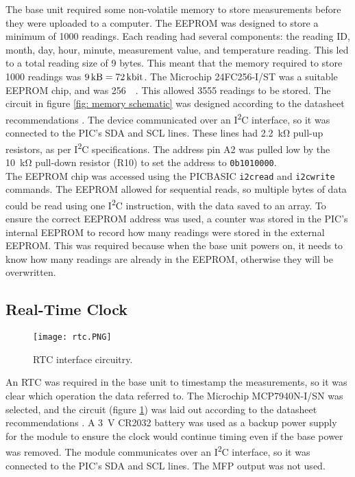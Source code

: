 The base unit required some non-volatile memory to store measurements before they were uploaded to a computer. The EEPROM was designed to store a minimum of 1000 readings. Each reading had several components: the reading ID, month, day, hour, minute, measurement value, and temperature reading. This led to a total reading size of 9 bytes. This meant that the memory required to store 1000 readings was $\SI{9}{\kilo\byte}=\SI{72}{\kilo\bit}$. The Microchip 24FC256-I/ST \cite{memory} was a suitable EEPROM chip, and was \SI{256}{\kilo\bit}. This allowed 3555 readings to be stored. The circuit in figure \ref{fig: memory schematic} was designed according to the datasheet recommendations \cite{memory}. The device communicated over an I\textsuperscript{2}C interface, so it was connected to the PIC's SDA and SCL lines. These lines had \SI{2.2}{\kilo\ohm} pull-up resistors, as per I\textsuperscript{2}C specifications. The address pin A2 was pulled low by the \SI{10}{\kilo\ohm} pull-down resistor (R10) to set the address to \verb|0b1010000|.\\

The EEPROM chip was accessed using the PICBASIC \verb|i2cread| and \verb|i2cwrite| commands. The EEPROM allowed for sequential reads, so multiple bytes of data could be read using one I\textsuperscript{2}C instruction, with the data saved to an array. To ensure the correct EEPROM address was used, a counter was stored in the PIC's internal EEPROM to record how many readings were stored in the external EEPROM. This was required because when the base unit powers on, it needs to know how many readings are already in the EEPROM, otherwise they will be overwritten.





\subsection{Real-Time Clock}
\begin{figure}[htb]
	\centering
	\texttt{[image: rtc.PNG]}
	\caption{RTC interface circuitry.}
	\label{fig: rtc schematic}
\end{figure}

An RTC was required in the base unit to timestamp the measurements, so it was clear which operation the data referred to. The Microchip MCP7940N-I/SN \cite{rtc} was selected, and the circuit (figure \ref{fig: rtc schematic}) was laid out according to the datasheet recommendations \cite{rtc}. A \SI{3}{\volt} CR2032 battery was used as a backup power supply for the module to ensure the clock would continue timing even if the base power was removed. The module communicates over an I\textsuperscript{2}C interface, so it was connected to the PIC's SDA and SCL lines. The MFP output was not used.





